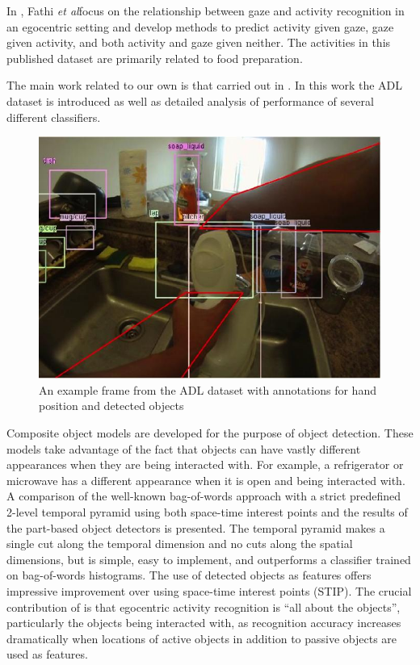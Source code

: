 \documentclass{bmvc2k}
\def\etal{\emph{et al}\bmvaOneDot}
\begin{document}
	In \cite{Fathi12}, Fathi \etal focus on the relationship between gaze and
	activity recognition in an egocentric setting and develop methods to
	predict activity given gaze, gaze given activity, and both
	activity and gaze given neither. The activities in this
	published dataset are primarily related to food preparation. 
	
	The main work related to our own is that carried out in \cite{Ramanan12}. 
	In this work the ADL dataset is introduced as well as detailed analysis of
	performance of several different classifiers. 
	\begin{figure}[t]
		\begin{center}
			  \includegraphics[width=0.7\linewidth]{figures/thumbnail.jpg}
		\end{center}
    \caption{An example frame from the ADL dataset with annotations for hand
    position and detected objects} 
				\label{fig:long}
				\label{fig:onecol}
	\end{figure}
  Composite object models are developed for the purpose of object detection. 
  These models take advantage of the fact that objects can have vastly
  different appearances when they are being interacted with. For example, a
  refrigerator or microwave has a different appearance when it is open and
  being interacted with. 
  A comparison of the well-known bag-of-words approach with a strict
  predefined
  2-level temporal pyramid using both space-time interest points and the
  results of the part-based object detectors is presented. The temporal pyramid makes 
  a single cut along the temporal dimension and no cuts along the
  spatial dimensions, but is simple, easy to implement, and outperforms a 
  classifier trained on bag-of-words histograms. The use of detected objects as
  features offers impressive improvement over using space-time interest points
  (STIP).
	The crucial contribution of
	\cite{Ramanan12} is that egocentric activity recognition is ``all about
	the objects'', particularly the objects being interacted with, as
	recognition accuracy increases dramatically when locations of active
  objects in addition to passive objects are used as features. 
\end{document}
